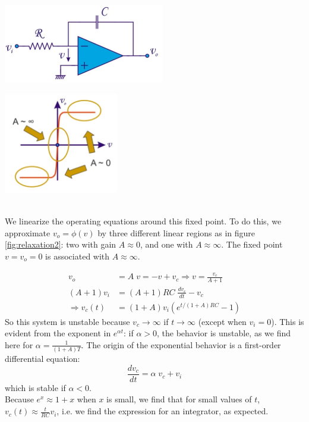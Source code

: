 \begin{minipage}{.5\textwidth}
	\centering
	\includegraphics[width=7cm]{figures/ch11/relaxation1.jpg}
	\label{fig:relaxation1}
\end{minipage}%
\begin{minipage}{.5\textwidth}
	\centering
	\includegraphics[width=5cm]{figures/ch11/relaxation2.jpg}
	\label{fig:relaxation2}
\end{minipage}
\\

We linearize the operating equations around this fixed point. To do this, we approximate $v_o = \phi(v)$ by three different linear regions as in figure \ref{fig:relaxation2}: two with gain $A \approx 0$, and one with $A \approx \infty$. The fixed point $v = v_o = 0$ is associated with $A \approx \infty$.

\begin{align*}
	v_o &= A\;v = -v + v_c \Rightarrow v = \frac{v_c}{A+1}\\
	(A+1) v_i  &= (A + 1) RC \; \frac{dv_c}{dt} - v_c \\
	\Rightarrow v_c(t) &= (1 + A) v_i (e^{t/(1 + A)RC} - 1)
\end{align*}
So this system is unstable because $v_c \rightarrow \infty$ if $t \rightarrow \infty$ (except when $v_i = 0$). This is evident from the exponent in $e^{\alpha t}$: if $\alpha > 0$, the behavior is unstable, as we find here for $\alpha = \frac{1}{(1 + A)T}$. The origin of the exponential behavior is a first-order differential equation:
$$
\frac{dv_c}{dt} = \alpha \; v_c + v_i
$$
which is stable if $\alpha < 0$.\\
Because $e^x \approx 1 + x$ when  $x$ is small, we find that for small values of $t$, $v_c(t) \approx \frac{t}{RC} v_i$, i.e. we find the expression for an integrator, as expected.\\

